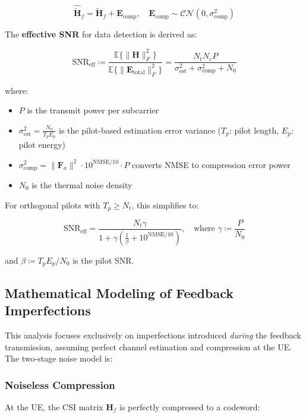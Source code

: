 \documentclass[lettersize,journal]{IEEEtran}
\begin{document}
\begin{equation}
\hat{\tilde{\mathbf{H}}}_f = \tilde{\mathbf{H}}_f + \mathbf{E}_{\text{comp}}, \quad \mathbf{E}_{\text{comp}} \sim \mathcal{CN}(0,\sigma_{\text{comp}}^2)
\end{equation}

The \textbf{effective SNR} for data detection is derived as:

\begin{equation}
\text{SNR}_{\text{eff}} \coloneqq \frac{\mathbb{E}\{\|\mathbf{H}\|_F^2\}}{\mathbb{E}\{\|\mathbf{E}_{\text{total}}\|_F^2\}} = \frac{N_t N_c P}{\sigma_{\text{est}}^2 + \sigma_{\text{comp}}^2 + N_0}
\end{equation}

\noindent where:
\begin{itemize}
\item $P$ is the transmit power per subcarrier
\item $\sigma_{\text{est}}^2 = \frac{N_0}{T_p E_p}$ is the pilot-based estimation error variance ($T_p$: pilot length, $E_p$: pilot energy)
\item $\sigma_{\text{comp}}^2 = \|\mathbf{F}_a\|^2 \cdot 10^{\text{NMSE}/10} \cdot P$ converts NMSE to compression error power
\item $N_0$ is the thermal noise density
\end{itemize}

For orthogonal pilots with $T_p \geq N_t$, this simplifies to:

\begin{equation}
\text{SNR}_{\text{eff}} = \frac{N_t \gamma}{1 + \gamma\left(\frac{1}{\beta} + 10^{\text{NMSE}/10}\right)}, \quad \text{where } \gamma \coloneqq \frac{P}{N_0}
\end{equation}

\noindent and $\beta \coloneqq T_p E_p/N_0$ is the pilot SNR. 


\subsection{Mathematical Modeling of Feedback Imperfections}
\label{subsec:feedback_noise}

This analysis focuses exclusively on imperfections introduced \textit{during} the feedback transmission, assuming perfect channel estimation and compression at the UE. The two-stage noise model is:

\subsubsection{Noiseless Compression}
At the UE, the CSI matrix $\mathbf{H}_f$ is perfectly compressed to a codeword:
\end{document}
